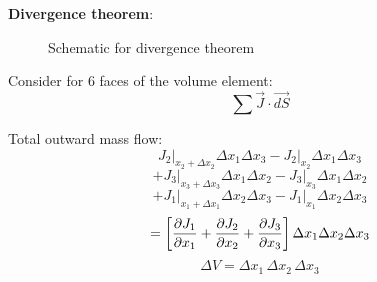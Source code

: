 
{\bf Divergence theorem}:

\begin{figure}[h]
\begin{center}
\end{center}
\caption{Schematic for divergence theorem}
\label{DivergenceSchematic}
\end{figure}

Consider for 6 faces of the volume element:
$$ \sum{\vec{J} \cdot \vec{dS}} $$

Total outward mass flow:
$$ \left. J_2 \right|_{x_2+\Delta x_2} \Delta x_1 \Delta x_3 - \left. J_2 \right|_{x_2} \Delta x_1 \Delta x_3 $$
$$ + \left. J_3 \right|_{x_3+\Delta x_3} \Delta x_1 \Delta x_2 - \left. J_3 \right|_{x_3} \Delta x_1 \Delta x_2 $$
$$ + \left. J_1 \right|_{x_1+\Delta x_1} \Delta x_2 \Delta x_3 - \left. J_1 \right|_{x_1} \Delta x_2 \Delta x_3 $$
$$ = \left[ { \partial J_1 \over \partial x_1} + { \partial J_2 \over \partial x_2} + { \partial J_3 \over \partial x_3}  \right] \Delta x_1 \Delta x_2 \Delta x_3 $$
$$ \Delta V = \Delta x_1 \, \Delta x_2 \, \Delta x_3 $$



